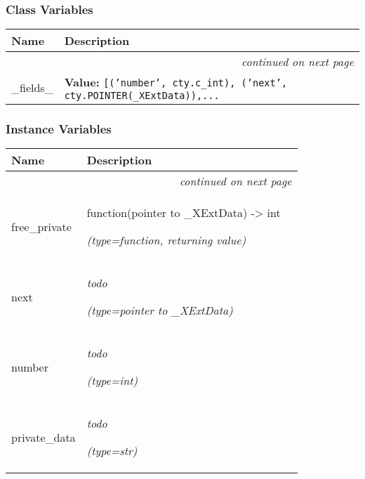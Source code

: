 
  \subsubsection{Class Variables}

    \vspace{-1cm}
\hspace{\varindent}\begin{longtable}{|p{\varnamewidth}|p{\vardescrwidth}|l}
\cline{1-2}
\cline{1-2} \centering \textbf{Name} & \centering \textbf{Description}& \\
\cline{1-2}
\endhead\cline{1-2}\multicolumn{3}{r}{\small\textit{continued on next page}}\\\endfoot\cline{1-2}
\endlastfoot\raggedright \_\-f\-i\-e\-l\-d\-s\-\_\- & \raggedright \textbf{Value:} 
{\tt [('number', cty.c\_int), ('next', cty.POINTER(\_XExtData)),\texttt{...}}&\\
\cline{1-2}
\end{longtable}



  \subsubsection{Instance Variables}

    \vspace{-1cm}
\hspace{\varindent}\begin{longtable}{|p{\varnamewidth}|p{\vardescrwidth}|l}
\cline{1-2}
\cline{1-2} \centering \textbf{Name} & \centering \textbf{Description}& \\
\cline{1-2}
\endhead\cline{1-2}\multicolumn{3}{r}{\small\textit{continued on next page}}\\\endfoot\cline{1-2}
\endlastfoot\raggedright f\-r\-e\-e\-\_\-p\-r\-i\-v\-a\-t\-e\- & \raggedright function(pointer to \_XExtData) -> int

            {\it (type=function, returning value)}&\\
\cline{1-2}
\raggedright n\-e\-x\-t\- & \raggedright \emph{todo}

            {\it (type=pointer to \_XExtData)}&\\
\cline{1-2}
\raggedright n\-u\-m\-b\-e\-r\- & \raggedright \emph{todo}

            {\it (type=int)}&\\
\cline{1-2}
\raggedright p\-r\-i\-v\-a\-t\-e\-\_\-d\-a\-t\-a\- & \raggedright \emph{todo}

            {\it (type=str)}&\\
\cline{1-2}
\end{longtable}


